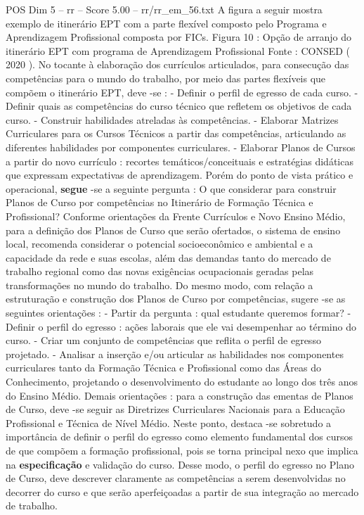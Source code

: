 \begin{textsample}{POS Dim 5 – rr – Score 5.00 – rr/rr\_em\_56.txt}
A figura a seguir mostra exemplo de itinerário EPT com a parte flexível composto pelo Programa e Aprendizagem Profissional composta por FICs.
Figura 10 : Opção de arranjo do itinerário EPT com programa de Aprendizagem Profissional Fonte : CONSED ( 2020 ).
No tocante à elaboração dos currículos articulados, para consecução das competências para o mundo do trabalho, por meio das partes flexíveis que compõem o itinerário EPT, deve -se : - Definir o perfil de egresso de cada curso. - Definir quais as competências do curso técnico que refletem os objetivos de cada curso. - Construir habilidades atreladas às competências. - Elaborar Matrizes Curriculares para os Cursos Técnicos a partir das competências, articulando as diferentes habilidades por componentes curriculares. - Elaborar Planos de Cursos a partir do novo currículo : recortes temáticos/conceituais e estratégias didáticas que expressam expectativas de aprendizagem.
Porém do ponto de vista prático e operacional, \textbf{segue} -se a seguinte pergunta : O que considerar para construir Planos de Curso por competências no Itinerário de Formação Técnica e Profissional?
Conforme orientações da Frente Currículos e Novo Ensino Médio, para a definição dos Planos de Curso que serão ofertados, o sistema de ensino local, recomenda considerar o potencial socioeconômico e ambiental e a capacidade da rede e suas escolas, além das demandas tanto do mercado de trabalho regional como das novas exigências ocupacionais geradas pelas transformações no mundo do trabalho.
Do mesmo modo, com relação a estruturação e construção dos Planos de Curso por competências, sugere -se as seguintes orientações : - Partir da pergunta : qual estudante queremos formar? - Definir o perfil do egresso : ações laborais que ele vai desempenhar ao término do curso. - Criar um conjunto de competências que reflita o perfil de egresso projetado. - Analisar a inserção e/ou articular as habilidades nos componentes curriculares tanto da Formação Técnica e Profissional como das Áreas do Conhecimento, projetando o desenvolvimento do estudante ao longo dos três anos do Ensino Médio.
Demais orientações : para a construção das ementas de Planos de Curso, deve -se seguir as Diretrizes Curriculares Nacionais para a Educação Profissional e Técnica de Nível Médio.
Neste ponto, destaca -se sobretudo a importância de definir o perfil do egresso como elemento fundamental dos cursos de que compõem a formação profissional, pois se torna principal nexo que implica na \textbf{especificação} e validação do curso.
Desse modo, o perfil do egresso no Plano de Curso, deve descrever claramente as competências a serem desenvolvidas no decorrer do curso e que serão aperfeiçoadas a partir de sua integração ao mercado de trabalho.

\end{textsample}
